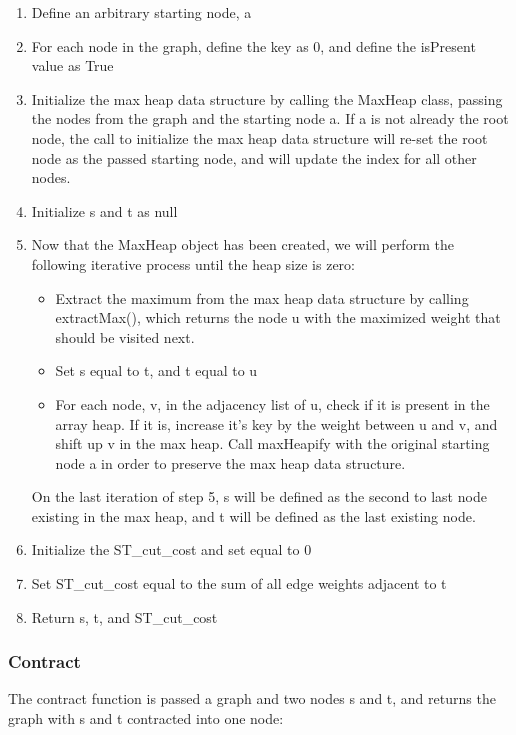     \begin{enumerate}
        \item Define an arbitrary starting node, a
        \item For each node in the graph, define the key as 0, and define the isPresent value as True
        \item Initialize the max heap data structure by calling the MaxHeap class, passing the nodes from the graph and the starting node a. If a is not already the root node, the call to initialize the max heap data structure will re-set the root node as the passed starting node, and will update the index for all other nodes.
        \item Initialize s and t as null
        \item Now that the MaxHeap object has been created, we will perform the following iterative process until the heap size is zero:
        	\begin{itemize}
    	    \item Extract the maximum from the max heap data structure by calling extractMax(), which returns the node u with the maximized weight that should be visited next. 
    	    \item Set s equal to t, and t equal to u
    	    \item For each node, v, in the adjacency list of u, check if it is present in the array heap. If it is, increase it's key by the weight between u and v, and shift up v in the max heap. Call maxHeapify with the original starting node a in order to preserve the max heap data structure. 
    	    \end{itemize}
    	On the last iteration of step 5, s will be defined as the second to last node existing in the max heap, and t will be defined as the last existing node. 
    	\item Initialize the ST{\_}cut{\_}cost and set equal to 0
    	\item Set ST{\_}cut{\_}cost equal to the sum of all edge weights adjacent to t
    	\item Return s, t, and ST{\_}cut{\_}cost
    \end{enumerate}

\subsubsection{Contract}   
The contract function is passed a graph and two nodes s and t, and returns the graph with s and t contracted into one node:

